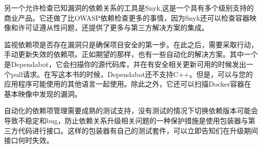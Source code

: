 另一个允许检查已知漏洞的依赖关系的工具是Snyk,这是一个具有多个级别支持的商业产品。它还做了比OWASP依赖检查更多的事情，因为Snyk还可以检查容器映像和许可证遵从性问题，还提供了更多与第三方解决方案的集成。


监视依赖项是否存在漏洞只是确保项目安全的第一步。在此之后，需要采取行动，手动更新失效的依赖项。正如期望的那样，也有一些自动化的解决方案。其中一个是Dependabot，它会扫描你的源代码库，并在有安全相关更新可用的时候发出一个pull请求。在写这本书的时候，Dependabot还不支持C++。但是，可以与您的应用程序可能使用的其他语言一起使用。除此之外，它还可以扫描Docker容器在基本映像中发现的漏洞。

自动化的依赖项管理需要成熟的测试支持，没有测试的情况下切换依赖版本可能会导致不稳定和bug，防止依赖关系升级相关问题的一种保护措施是使用包装器与第三方代码进行接口。这样的包装器有自己的测试套件，可以立即告知们在升级期间接口何时失效。










